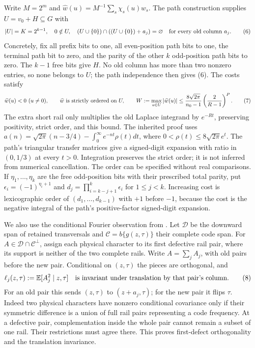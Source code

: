 \documentclass[11pt]{article}
\begin{document}
Write $M=2^m$ and
$\widehat w(u)=M^{-1}\sum_s\chi_s(u)w_s$.
The path construction supplies $U=v_0+H\subseteq G$ with
\[
 |U|=K=2^{k-1},\quad 0\notin U,\quad
 (U\cup\{0\})\cap((U\cup\{0\})+a_j)=\varnothing
                          \quad\hbox{for every old column }a_j. \tag{6}
\]
Concretely, fix all prefix bits to one, all even-position path bits to
one, the terminal path bit to zero, and the parity of the other $k$
odd-position path bits to zero. The $k-1$ free bits give $H$.
No old column has more than two nonzero entries, so none belongs to
$U$; the path independence then gives (6). The costs satisfy
\[
 \widehat w(u)<0\ (u\ne0),\qquad
 \widehat w\hbox{ is strictly ordered on }U,\qquad
 W:=\max_{u\in U}|\widehat w(u)|
 \le\frac{8\sqrt{2\pi}}{n_0-1}
                         \left(\frac2{R-1}\right)^P.     \tag{7}
\]
The extra short rail only multiplies the old Laplace integrand by
$e^{-Rt}$, preserving positivity, strict order, and this bound.
The inherited proof uses
$a(n)=\sqrt{2\pi}(n-3/4)-\int_0^\infty e^{-nt}\rho(t)dt$,
where $0<\rho(t)\le8\sqrt{2\pi}e^t$. The path's triangular transfer
matrices give a signed-digit expansion with ratio in $(0,1/3)$ at
every $t>0$. Integration preserves the strict order; it is not inferred
from numerical cancellation. The order can be specified without real
comparisons. If $\eta_1,\ldots,\eta_k$ are the free odd-position bits
with their prescribed total parity, put
$\epsilon_i=(-1)^{\eta_i+1}$ and
$d_j=\prod_{i=k-j+1}^k\epsilon_i$ for $1\le j<k$.
Increasing cost is lexicographic order of $(d_1,\ldots,d_{k-1})$
with $+1$ before $-1$, because the cost is the negative integral of
the path's positive-factor signed-digit expansion.

We also use the conditional Fourier observation from \cite{shared}.
Let $\mathcal D$ be the downward span of retained transversals and
$\mathcal C=b\{g(z,\tau)\}$ their complete code span.
For $A\in\mathcal D\cap\mathcal C^\perp$, assign each physical character
to its first defective rail pair, where its support is neither of the
two complete rails. Write $A=\sum_j A_j$, with old pairs before the new
pair. Conditional on $(z,\tau)$ the pieces are orthogonal, and
\[
 \ell_j(z,\tau):=\mathbb E[A_j^2\mid z,\tau]
 \quad\hbox{is invariant under translation by that pair's column}. \tag{8}
\]
For an old pair this sends $(z,\tau)$ to $(z+a_j,\tau)$; for the new
pair it flips $\tau$. Indeed two physical characters have nonzero
conditional covariance only if their symmetric difference is a union
of full rail pairs representing a code frequency. At a defective pair,
complementation inside the whole pair cannot remain a subset of one
rail. Their restrictions must agree there. This proves first-defect
orthogonality and the translation invariance.
\end{document}
